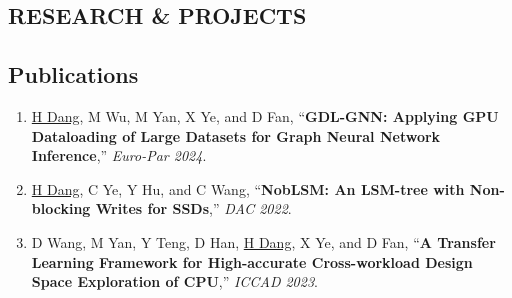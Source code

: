 \documentclass[a4paper,10pt]{ctexart} %
\begin{document}

\begin{keepsection}
\section{RESEARCH \& PROJECTS}

\subsection{Publications}
    \begin{enumerate}
        \item \label{GDL-GNN-Paper} \underline{H Dang}, M Wu, M Yan, X Ye, and D Fan, ``\textbf{GDL-GNN: Applying GPU Dataloading of Large Datasets for Graph Neural Network Inference},'' \textit{Euro-Par 2024}.
        \item \label{NobLSM-Paper} \underline{H Dang}, C Ye, Y Hu, and C Wang, ``\textbf{NobLSM: An LSM-tree with Non-blocking Writes for SSDs},'' \textit{DAC 2022}.
        \item D Wang, M Yan, Y Teng, D Han, \underline{H Dang}, X Ye, and D Fan, ``\textbf{A Transfer Learning Framework for High-accurate Cross-workload Design Space Exploration of CPU},'' \textit{ICCAD 2023}.
    \end{enumerate}
\end{keepsection}
\end{document}

